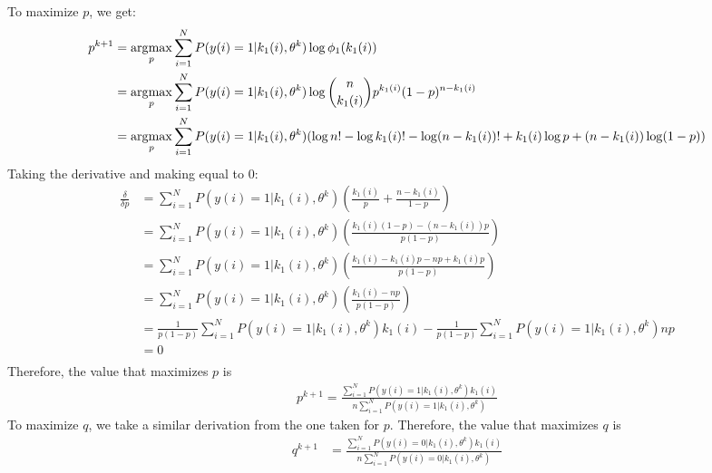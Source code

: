 To maximize $p$, we get:
\begin{align*}
p^{k+1} &= \operatorname*{\arg\!\max}_p \sum_{i=1}^{N}  P(y(i) = 1 | k_1(i), \theta^{k}) \log \phi_1(k_1(i)) \\
&= \operatorname*{\arg\!\max}_p \sum_{i=1}^{N}  P(y(i) = 1 | k_1(i), \theta^{k}) \log \binom{n}{k_1(i)} p^{k_1(i)} (1-p)^{n-k_1(i)}  \\
&= \operatorname*{\arg\!\max}_p \sum_{i=1}^{N}  P(y(i) = 1 | k_1(i), \theta^{k}) (\log n! - \log k_1(i)! - \log (n-k_1(i))! + k_1(i) \log p + (n-k_1(i)) \log (1-p))
\end{align*}
Taking the derivative and making equal to 0:
\begin{align*}
\frac{\delta}{\delta p} &= \sum_{i=1}^{N}  P(y(i) = 1 | k_1(i), \theta^{k}) \left( \frac{k_1(i)}{p} + \frac{n-k_1(i)}{1-p} \right) \\
&= \sum_{i=1}^{N}  P(y(i) = 1 | k_1(i), \theta^{k}) \left( \frac{k_1(i)(1-p) - (n-k_1(i))p}{p(1-p)}
\right) \\
&= \sum_{i=1}^{N}  P(y(i) = 1 | k_1(i), \theta^{k}) \left( \frac{k_1(i)- k_1(i)p - np +k_1(i)p}{p(1-p)} \right) \\
&= \sum_{i=1}^{N}  P(y(i) = 1 | k_1(i), \theta^{k}) \left( \frac{k_1(i)- np}{p(1-p)} \right) \\
&= \frac{1}{p(1-p)} \sum_{i=1}^{N} P(y(i) = 1 | k_1(i), \theta^{k}) k_1(i) - \frac{1}{p(1-p)} \sum_{i=1}^{N} P(y(i) = 1 | k_1(i), \theta^{k}) np \\
&= 0 \\
\end{align*}
Therefore, the value that maximizes $p$ is
\begin{align*}
p^{k+1} = \frac{\sum_{i=1}^{N} P(y(i) = 1 | k_1(i), \theta^{k}) k_1(i)}{n \sum_{i=1}^{N} P(y(i) = 1 | k_1(i), \theta^{k})}
\end{align*}
To maximize $q$, we take a similar derivation from the one taken for $p$. Therefore, the value that maximizes $q$ is
\begin{align*}
q^{k+1} &= \frac{\sum_{i=1}^{N} P(y(i) = 0 | k_1(i), \theta^{k}) k_1(i)}{n \sum_{i=1}^{N} P(y(i) = 0 | k_1(i), \theta^{k})}
\end{align*}




